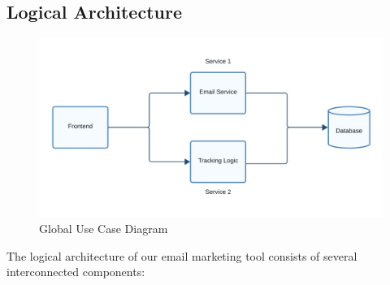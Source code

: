 \clearpage
\subsection{Logical Architecture}

\begin{figure}[ht]
	\centering
	\includegraphics[width=\linewidth]{Images//images/Microservices architechture.png}
	\caption{Global Use Case Diagram}
	\label{fig:Global Use Case Diagram}
\end{figure}
The logical architecture of our email marketing tool consists of several interconnected components:

